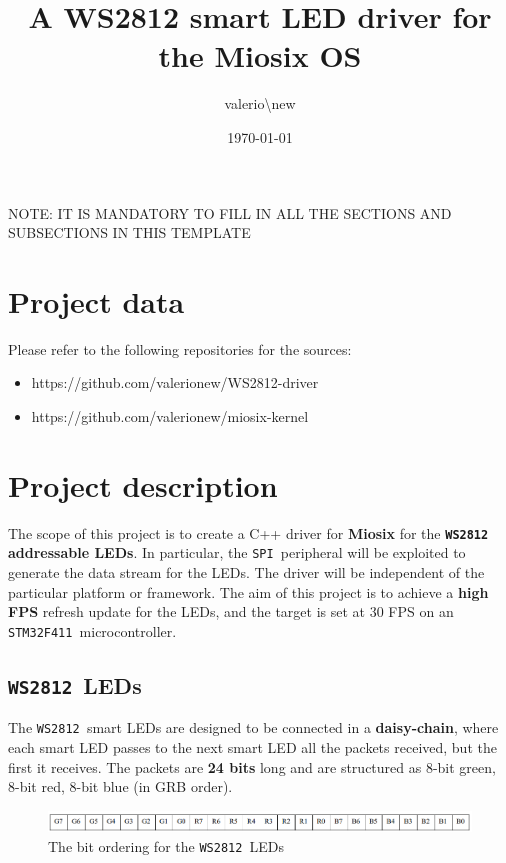 \documentclass[10pt,a4]{article}
\author{valerio\textbackslash new}
\date{\today}
\title{A WS2812 smart LED driver for the Miosix OS}
\newcommand{\stm}{\texttt{STM32F411 }}
\newcommand{\ws}{\texttt{WS2812 }}
\newcommand{\spi}{\texttt{SPI }}
\begin{document}
\maketitle
\tableofcontents

\begin{center}
NOTE: IT IS MANDATORY TO FILL IN ALL THE SECTIONS AND SUBSECTIONS IN THIS TEMPLATE
\end{center}

\section{Project data}
Please refer to the following repositories for the sources:
\begin{itemize}
\item https://github.com/valerionew/WS2812-driver
\item https://github.com/valerionew/miosix-kernel
\end{itemize}

\newpage

\section{Project description}
The scope of this project is to create a C++ driver for \textbf{Miosix} for the \textbf{\ws addressable LEDs}. In particular, the \spi peripheral will be exploited to generate the data stream for the LEDs. The driver will be independent of the particular platform or framework. The aim of this project is to achieve a \textbf{high FPS} refresh update for the LEDs, and the target is set at 30 FPS on an \stm microcontroller.
\subsection{\ws LEDs}
The \ws smart LEDs are designed to be connected in a \textbf{daisy-chain}, where each smart LED passes to the next smart LED all the packets received, but the first it receives.
The packets are \textbf{24 bits} long and are structured as 8-bit green, 8-bit red, 8-bit blue (in GRB order).

\begin{figure}[H]
\centering
\includegraphics[width=\linewidth]{grb.png}
\caption{\label{fig:grb}The bit ordering for the \ws LEDs}
\end{figure}
 
\end{document}
